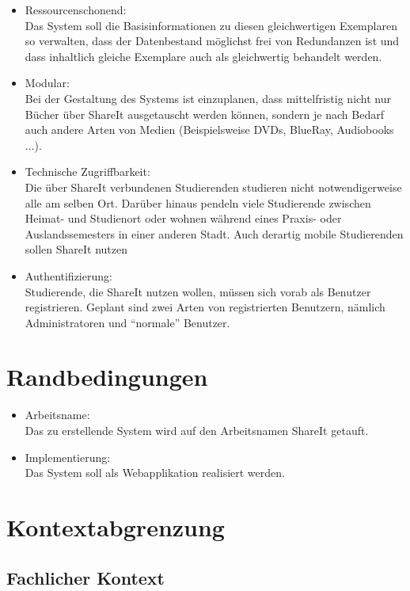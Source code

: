 \documentclass[]{report}
\begin{document}
\begin{itemize}
\item
Ressourcenschonend:\\
Das System soll die Basisinformationen zu diesen gleichwertigen Exemplaren so verwalten, dass der Datenbestand möglichst frei von Redundanzen ist und dass inhaltlich gleiche Exemplare auch als gleichwertig behandelt werden.
\item
Modular:\\
Bei der Gestaltung des Systems ist einzuplanen, dass mittelfristig nicht nur Bücher über ShareIt ausgetauscht werden können, sondern je nach Bedarf auch andere Arten von Medien (Beispielsweise DVDs, BlueRay, Audiobooks ...).
\item
Technische Zugriffbarkeit:\\
Die über ShareIt verbundenen Studierenden studieren nicht notwendigerweise alle am selben Ort. Darüber hinaus pendeln viele Studierende zwischen Heimat- und Studienort oder wohnen während eines Praxis- oder Auslandssemesters in einer anderen Stadt. Auch derartig mobile Studierenden sollen ShareIt nutzen
\item
Authentifizierung:\\
Studierende, die ShareIt nutzen wollen, müssen sich vorab als Benutzer registrieren. Geplant sind zwei Arten von registrierten Benutzern, nämlich Administratoren und “normale” Benutzer.
\end{itemize}

\newpage

\section{Randbedingungen}\label{section-architecture-constraints}
\begin{itemize}
\item
Arbeitsname:\\
Das zu erstellende System wird auf den Arbeitsnamen ShareIt getauft.
\item
Implementierung:\\
Das System soll als Webapplikation realisiert werden.
\end{itemize}
\section{Kontextabgrenzung}\label{section-system-scope-and-context}

\subsection{Fachlicher Kontext}\label{_fachlicher_kontext}
\end{document}
